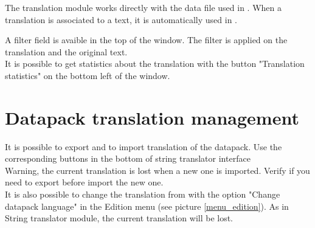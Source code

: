The translation module works directly with the data file used in \tria. When a translation is associated to a text, it is automatically used in \tria.

A filter field is avaible in the top of the window. The filter is applied on the translation and the original text.\\


It is possible to get statistics about the translation with the button "Translation statistics" on the bottom left of the window.\\


\section{Datapack translation management}
It is possible to export and to import translation of the datapack. Use the corresponding buttons in the bottom of string translator interface \\

Warning, the current translation is lost when a new one is imported. Verify if you need to export before import the new one.\\

It is also possible to change the translation from \tria with the option "Change datapack language" in the Edition menu (see picture \ref{menu_edition}). As in String translator module, the current translation will be lost.\\


